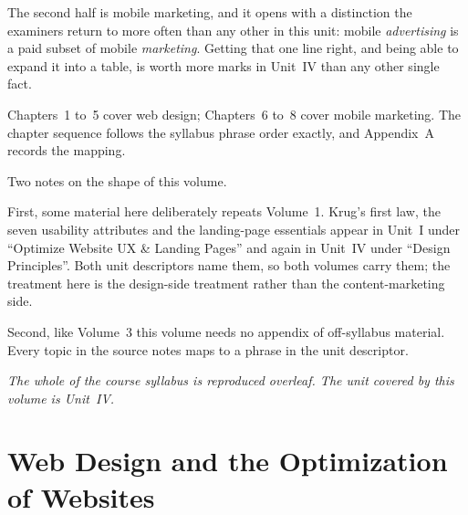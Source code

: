 \documentclass{MMTextbook}
\begin{document}
The second half is mobile marketing, and it opens with a distinction the
examiners return to more often than any other in this unit: mobile
\emph{advertising} is a paid subset of mobile \emph{marketing}. Getting that one
line right, and being able to expand it into a table, is worth more marks in
Unit~IV than any other single fact.

Chapters~1 to~5 cover web design; Chapters~6 to~8 cover mobile marketing. The
chapter sequence follows the syllabus phrase order exactly, and Appendix~A
records the mapping.

Two notes on the shape of this volume.

First, some material here deliberately repeats Volume~1. Krug's first law, the
seven usability attributes and the landing-page essentials appear in Unit~I under
``Optimize Website UX \& Landing Pages'' and again in Unit~IV under ``Design
Principles''. Both unit descriptors name them, so both volumes carry them; the
treatment here is the design-side treatment rather than the content-marketing
side.

Second, like Volume~3 this volume needs no appendix of off-syllabus material.
Every topic in the source notes maps to a phrase in the unit descriptor.

\vspace{12pt}
\noindent\emph{The whole of the course syllabus is reproduced overleaf. The
unit covered by this volume is Unit~IV.}




\cleardoublepage
{}
\tableofcontents
\cleardoublepage
\listoffigures
\cleardoublepage
\listoftables

\mainmatter
\pagestyle{mmmain}

\chapter{Web Design and the Optimization of Websites}

\end{document}

